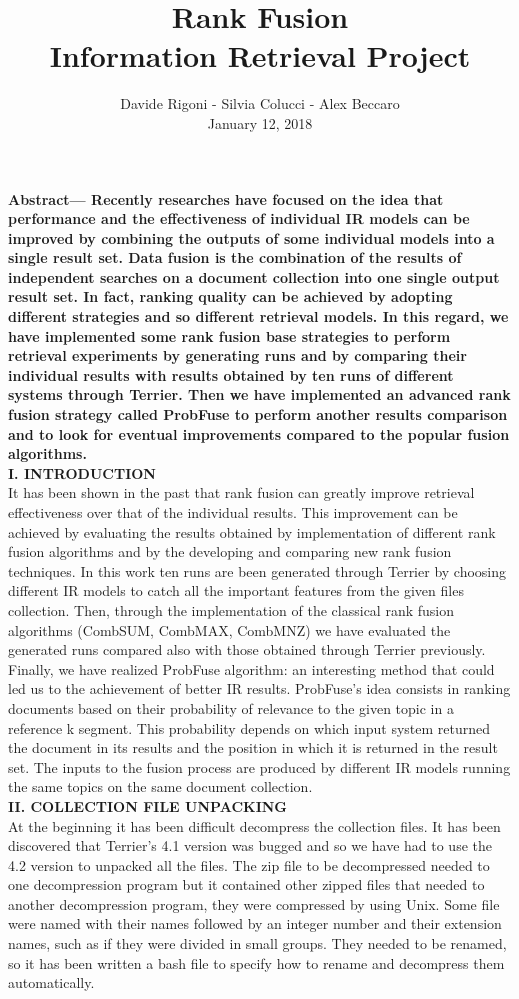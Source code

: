 \documentclass[12pt,journal]{IEEEtran}
\title{Rank Fusion \\ {\huge Information Retrieval Project}}
\author{Davide Rigoni - Silvia Colucci - Alex Beccaro \\ January 12, 2018}
\begin{document}
	\maketitle
	\textbf {Abstract— Recently researches have focused on the idea that performance and the effectiveness of individual IR models can be improved by combining the outputs of some individual models into a single result set. Data fusion is the combination of the results of independent searches on a document collection into one single output result set. In fact, ranking quality can be achieved by adopting different strategies and so different retrieval models.
In this regard, we have implemented some rank fusion base strategies to perform retrieval experiments by generating runs and by comparing their individual results with results obtained by ten runs of different systems through Terrier.
Then we have implemented an advanced rank fusion strategy called ProbFuse to perform another results comparison and to look for eventual improvements compared to the popular fusion algorithms.} \\

\textbf{I. INTRODUCTION} \\
It has been shown in the past that rank fusion can greatly improve retrieval effectiveness over that of the individual results.
This improvement can be achieved by evaluating the results obtained by implementation of different rank fusion algorithms and by the developing and comparing new rank fusion techniques.
In this work ten runs are been generated through Terrier by choosing different IR models to catch all the important features from the given files collection. Then, through the implementation of the classical rank fusion algorithms (CombSUM, CombMAX, CombMNZ) we have evaluated the generated runs compared also with those obtained through Terrier previously. 
Finally, we have realized ProbFuse algorithm: an interesting method that could led us to the achievement of better IR results.
ProbFuse’s idea consists in ranking documents based on their probability of relevance to the given topic in a reference k segment. This probability depends on which input system returned the document in its results and the position in which it is returned in the result set. 
The inputs to the fusion process are produced by different IR models running the same topics on the same document collection.\\

\textbf{II.	COLLECTION FILE UNPACKING} \\
At the beginning it has been difficult decompress the collection files. It has been discovered that Terrier’s 4.1 version was bugged and so we have had to use the 4.2 version to unpacked all the files.
The zip file to be decompressed needed to one decompression program but it contained other zipped files that needed to another decompression program, they were compressed by using Unix. Some file were named with their names followed by an integer number and their extension names, such as if they were divided in small groups. They needed to be renamed, so it has been written a bash file to specify how to rename and decompress them automatically. \\
\end{document}
